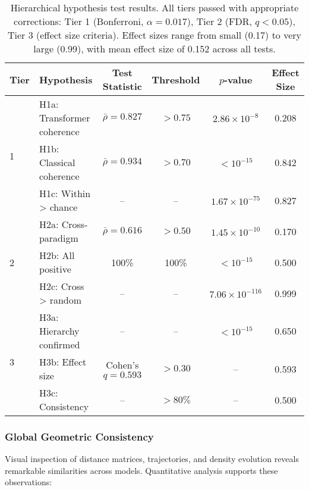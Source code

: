 \documentclass[11pt,letterpaper]{article}
\begin{document}
\begin{table}[h]
\centering
\begin{tabular}{llcccc}
\toprule
Tier & Hypothesis & Test Statistic & Threshold & $p$-value & Effect Size \\
\midrule
\multirow{3}{*}{1} & H1a: Transformer coherence & $\bar{\rho} = 0.827$ & $> 0.75$ & $2.86 \times 10^{-8}$ & 0.208 \\
& H1b: Classical coherence & $\bar{\rho} = 0.934$ & $> 0.70$ & $< 10^{-15}$ & 0.842 \\
& H1c: Within > chance & -- & -- & $1.67 \times 10^{-75}$ & 0.827 \\
\midrule
\multirow{3}{*}{2} & H2a: Cross-paradigm & $\bar{\rho} = 0.616$ & $> 0.50$ & $1.45 \times 10^{-10}$ & 0.170 \\
& H2b: All positive & 100\% & 100\% & $< 10^{-15}$ & 0.500 \\
& H2c: Cross > random & -- & -- & $7.06 \times 10^{-116}$ & 0.999 \\
\midrule
\multirow{3}{*}{3} & H3a: Hierarchy confirmed & -- & -- & $< 10^{-15}$ & 0.650 \\
& H3b: Effect size & Cohen's $q = 0.593$ & $> 0.30$ & -- & 0.593 \\
& H3c: Consistency & -- & $> 80\%$ & -- & 0.500 \\
\bottomrule
\end{tabular}
\caption{Hierarchical hypothesis test results. All tiers passed with appropriate corrections: Tier 1 (Bonferroni, $\alpha = 0.017$), Tier 2 (FDR, $q < 0.05$), Tier 3 (effect size criteria). Effect sizes range from small (0.17) to very large (0.99), with mean effect size of 0.152 across all tests.}
\label{tab:hypothesis_tests}
\end{table}

\subsubsection{Global Geometric Consistency}

Visual inspection of distance matrices, trajectories, and density evolution reveals remarkable similarities across models. Quantitative analysis supports these observations:
\end{document}
